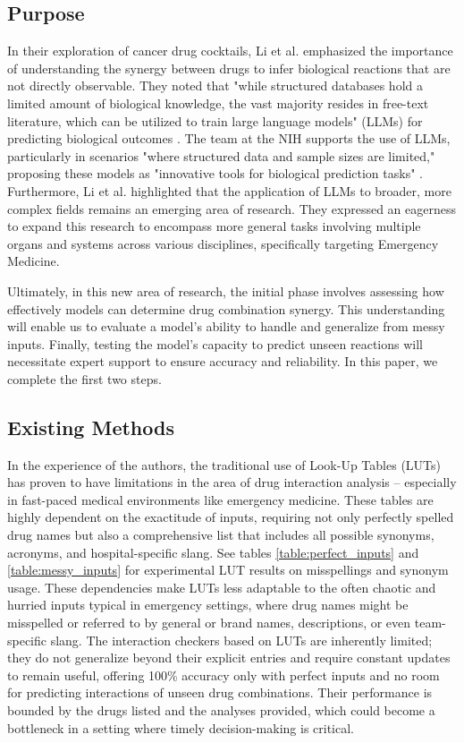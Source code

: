 \documentclass[11pt]{article}
\begin{document}
\subsection{Purpose}
In their exploration of cancer drug cocktails, Li et al. emphasized the importance of understanding the synergy between drugs to infer biological reactions that are not directly observable. They noted that "while structured databases hold a limited amount of biological knowledge, the vast majority resides in free-text literature, which can be utilized to train large language models" (LLMs) for predicting biological outcomes \cite{Li2023-lq}. The team at the NIH supports the use of LLMs, particularly in scenarios "where structured data and sample sizes are limited," proposing these models as "innovative tools for biological prediction tasks" \cite{Li2023-lq}. Furthermore, Li et al. highlighted that the application of LLMs to broader, more complex fields remains an emerging area of research. They expressed an eagerness to expand this research to encompass more general tasks involving multiple organs and systems across various disciplines, specifically targeting Emergency Medicine.

Ultimately, in this new area of research, the initial phase involves assessing how effectively models can determine drug combination synergy. This understanding will enable us to evaluate a model's ability to handle and generalize from messy inputs. Finally, testing the model's capacity to predict unseen reactions will necessitate expert support to ensure accuracy and reliability. In this paper, we complete the first two steps.


\subsection{Existing Methods}
In the experience of the authors, the traditional use of Look-Up Tables (LUTs) has proven to have limitations in the area of drug interaction analysis -- especially in fast-paced medical environments like emergency medicine. These tables are highly dependent on the exactitude of inputs, requiring not only perfectly spelled drug names but also a comprehensive list that includes all possible synonyms, acronyms, and hospital-specific slang. See tables \ref{table:perfect_inputs} and \ref{table:messy_inputs} for experimental LUT results on misspellings and synonym usage. These dependencies make LUTs less adaptable to the often chaotic and hurried inputs typical in emergency settings, where drug names might be misspelled or referred to by general or brand names, descriptions, or even team-specific slang. The interaction checkers based on LUTs are inherently limited; they do not generalize beyond their explicit entries and require constant updates to remain useful, offering 100\% accuracy only with perfect inputs and no room for predicting interactions of unseen drug combinations. Their performance is bounded by the drugs listed and the analyses provided, which could become a bottleneck in a setting where timely decision-making is critical.
\end{document}
